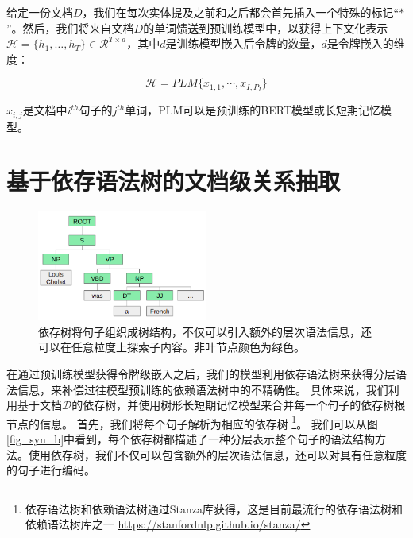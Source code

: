 \documentclass[bachelor]{thesis-uestc}
\begin{document}
给定一份文档$D$，我们在每次实体提及之前和之后都会首先插入一个特殊的标记“$*$”\cite{zhang-etal-2017-position}。然后，我们将来自文档$D$的单词馈送到预训练模型中，以获得上下文化表示 $\mathcal{H}=\{h_1, \dots, h_T\} \in \mathcal{R}^{T \times d}$，其中$d$是训练模型嵌入后令牌的数量，$d$是令牌嵌入的维度：

\begin{equation}
    \mathcal{H} = PLM \{x_{1,1},\cdots, x_{I,P_I}\}
\end{equation}\label{PLM}

$x_{i, j}$是文档中$i^{th}$句子的$j^{th}$单词，PLM可以是预训练的BERT模型\cite{BERT}或长短期记忆模型。

\section{基于依存语法树的文档级关系抽取}

\begin{figure}[t]
    \includegraphics[width=0.5\textwidth]{misc/constituency.png}
    \caption{依存树将句子组织成树结构，不仅可以引入额外的层次语法信息，还可以在任意粒度上探索子内容。非叶节点颜色为绿色。} 
\end{figure}\label{fig_syn_b}


在通过预训练模型获得令牌级嵌入之后，我们的模型利用依存语法树来获得分层语法信息，来补偿过往模型预训练的依赖语法树中的不精确性。
具体来说，我们利用基于文档$\mathcal{D}$的依存树，并使用树形长短期记忆模型\cite{miwa-bansal-2016-end, duan-etal-2022-just}来合并每一个句子的依存树根节点的信息。
首先，我们将每个句子解析为相应的依存树 \footnote{依存语法树和依赖语法树通过Stanza库获得，这是目前最流行的依存语法树和依赖语法树库之一 \href{https://stanfordnlp.github.io/stanza/} { https://stanfordnlp.github.io/stanza/}}。
我们可以从图\ref{fig_syn_b}中看到，每个依存树都描述了一种分层表示整个句子的语法结构方法。使用依存树，我们不仅可以包含额外的层次语法信息，还可以对具有任意粒度的句子进行编码。\par
\end{document}
